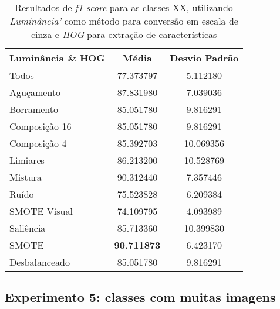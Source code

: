 \begin{itemize}
\begin{table}[]
\centering
\caption{Resultados de \textit{f1-score} para as classes XX, utilizando \emph{Luminância'} como método para conversão em escala de cinza e \emph{HOG} para extração de características}
\label{tab:resultados:4:melhor}
\begin{tabular}{|l|c|c|}
\hline
\textbf{Luminância \& HOG} & \textbf{Média}     & \textbf{Desvio Padrão} \\ \hline
Todos                      & 77.373797          & 5.112180               \\ \hline
Aguçamento                 & 87.831980          & 7.039036               \\ \hline
Borramento                 & 85.051780          & 9.816291               \\ \hline
Composição 16              & 85.051780          & 9.816291               \\ \hline
Composição 4               & 85.392703          & 10.069356              \\ \hline
Limiares                   & 86.213200          & 10.528769              \\ \hline
Mistura                    & 90.312440          & 7.357446               \\ \hline
Ruído                      & 75.523828          & 6.209384               \\ \hline
SMOTE Visual               & 74.109795          & 4.093989               \\ \hline
Saliência                  & 85.713360          & 10.399830              \\ \hline
SMOTE                      & \textbf{90.711873} & 6.423170               \\ \hline
Desbalanceado              & 85.051780          & 9.816291               \\ \hline
\end{tabular}
\end{table}


\end{itemize}

\FloatBarrier
\subsection{Experimento 5: classes com muitas imagens}

